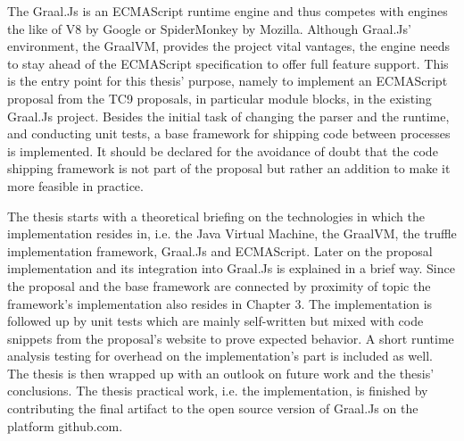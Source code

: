 The Graal.Js is an ECMAScript runtime engine and thus competes with engines the like of V8 by Google or SpiderMonkey by Mozilla. Although Graal.Js' environment, the GraalVM, provides the project vital vantages, the engine needs to stay ahead of the ECMAScript specification to offer full feature support. This is the entry point for this thesis' purpose, namely to implement an ECMAScript proposal from the TC9 proposals, in particular module blocks, in the existing Graal.Js project. Besides the initial task of changing the parser and the runtime, and conducting unit tests, a base framework for shipping code between processes is implemented.  It should be declared for the avoidance of doubt that the code shipping framework is not part of the proposal but rather an addition to make it more feasible in practice.

The thesis starts with a theoretical briefing on the technologies in which the implementation resides in, i.e. the Java Virtual Machine, the GraalVM, the truffle implementation framework, Graal.Js and ECMAScript. Later on the proposal implementation and its integration into Graal.Js is explained in a brief way. Since the proposal and the base framework are connected by proximity of topic the framework's implementation also resides in Chapter 3. The implementation is followed up by unit tests which are mainly self-written but mixed with code snippets from the proposal's website to prove expected behavior. A short runtime analysis testing for overhead on the implementation's part is included as well. The thesis is then wrapped up with an outlook on future work and the thesis' conclusions. The thesis practical work, i.e. the implementation, is finished by contributing the final artifact to the open source version of Graal.Js on the platform github.com.

